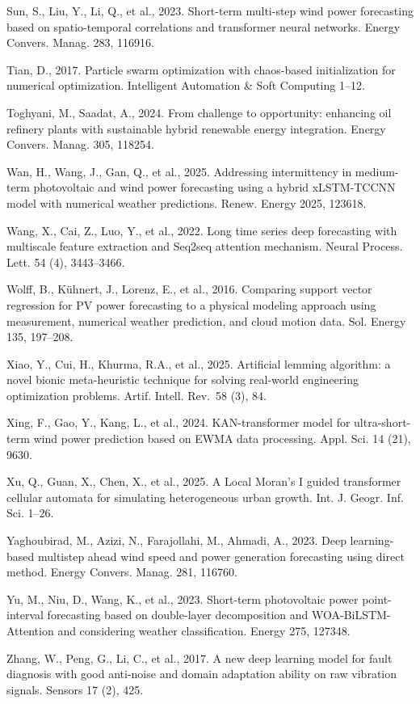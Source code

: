 \documentclass[
  10
]{article}
\begin{document}
Sun, S., Liu, Y., Li, Q., et al., 2023. Short-term multi-step wind power
forecasting based on spatio-temporal correlations and transformer neural
networks. Energy Convers. Manag. 283, 116916.

Tian, D., 2017. Particle swarm optimization with chaos-based
initialization for numerical optimization. Intelligent Automation \&
Soft Computing 1--12.

Toghyani, M., Saadat, A., 2024. From challenge to opportunity: enhancing
oil refinery plants with sustainable hybrid renewable energy
integration. Energy Convers. Manag. 305, 118254.

Wan, H., Wang, J., Gan, Q., et al., 2025. Addressing intermittency in
medium-term photovoltaic and wind power forecasting using a hybrid
xLSTM-TCCNN model with numerical weather predictions. Renew. Energy
2025, 123618.

Wang, X., Cai, Z., Luo, Y., et al., 2022. Long time series deep
forecasting with multiscale feature extraction and Seq2seq attention
mechanism. Neural Process. Lett. 54 (4), 3443--3466.

Wolff, B., Kühnert, J., Lorenz, E., et al., 2016. Comparing support
vector regression for PV power forecasting to a physical modeling
approach using measurement, numerical weather prediction, and cloud
motion data. Sol. Energy 135, 197--208.

Xiao, Y., Cui, H., Khurma, R.A., et al., 2025. Artificial lemming
algorithm: a novel bionic meta-heuristic technique for solving
real-world engineering optimization problems. Artif. Intell. Rev.~58
(3), 84.

Xing, F., Gao, Y., Kang, L., et al., 2024. KAN-transformer model for
ultra-short-term wind power prediction based on EWMA data processing.
Appl. Sci. 14 (21), 9630.

Xu, Q., Guan, X., Chen, X., et al., 2025. A Local Moran's I guided
transformer cellular automata for simulating heterogeneous urban growth.
Int. J. Geogr. Inf. Sci. 1--26.

Yaghoubirad, M., Azizi, N., Farajollahi, M., Ahmadi, A., 2023. Deep
learning-based multistep ahead wind speed and power generation
forecasting using direct method. Energy Convers. Manag. 281, 116760.

Yu, M., Niu, D., Wang, K., et al., 2023. Short-term photovoltaic power
point-interval forecasting based on double-layer decomposition and
WOA-BiLSTM-Attention and considering weather classification. Energy 275,
127348.

Zhang, W., Peng, G., Li, C., et al., 2017. A new deep learning model for
fault diagnosis with good anti-noise and domain adaptation ability on
raw vibration signals. Sensors 17 (2), 425.
\end{document}
